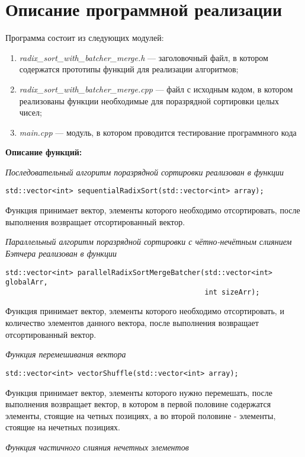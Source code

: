 \documentclass{report}
\begin{document}
\section*{Описание программной реализации}
\par Программа состоит из следующих модулей:
\begin{enumerate}
\item \textit{radix\_sort\_with\_batcher\_merge.h} — заголовочный файл, в котором содержатся прототипы функций для реализации алгоритмов;
\item \textit{radix\_sort\_with\_batcher\_merge.cpp} — файл с исходным кодом, в котором реализованы функции необходимые для поразрядной сортировки целых чисел;
\item \textit{main.cpp} — модуль, в котором проводится тестирование программного кода
\end{enumerate}
\par \textbf{Описание функций:}
\par \textit{Последовательный алгоритм поразрядной сортировки реализован в функции}
\begin{lstlisting}
std::vector<int> sequentialRadixSort(std::vector<int> array);
\end{lstlisting}
Функция принимает вектор, элементы которого необходимо отсортировать, после выполнения возвращает отсортированный вектор.
\par \textit{Параллельный алгоритм поразрядной сортировки с чётно-нечётным слиянием Бэтчера реализован в функции}
\begin{lstlisting}
std::vector<int> parallelRadixSortMergeBatcher(std::vector<int> globalArr, 
                                               int sizeArr);
\end{lstlisting}
Функция принимает вектор, элементы которого необходимо отсортировать, и количество элементов данного вектора, после выполнения возвращает отсортированный вектор.
\par \textit{Функция перемешивания вектора}
\begin{lstlisting}
std::vector<int> vectorShuffle(std::vector<int> array);
\end{lstlisting}
Функция принимает вектор, элементы которого нужно перемешать, после выполнения возвращает вектор, в котором в первой половине содержатся элементы, стоящие на четных позициях, а во второй половине - элементы, стоящие на нечетных позициях.
\par \textit{Функция частичного слияния нечетных элементов}
\end{document}
